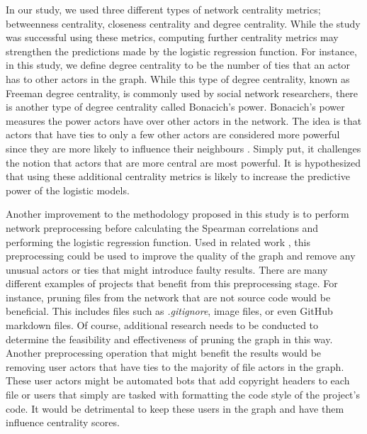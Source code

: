 \documentclass{sig-alternate-05-2015}
\begin{document}
In our study, we used three different types of network centrality metrics; betweenness centrality, closeness centrality and degree centrality. While the study was successful using these metrics, computing further centrality metrics may strengthen the predictions made by the logistic regression function. For instance, in this study, we define degree centrality to be the number of ties that an actor has to other actors in the graph. While this type of degree centrality, known as Freeman degree centrality, is commonly used by social network researchers, there is another type of degree centrality called Bonacich's power. Bonacich's power measures the power actors have over other actors in the network. The idea is that actors that have ties to only a few other actors are considered more powerful since they are more likely to influence their neighbours \cite{hanneman:network_methods}. Simply put, it challenges the notion that actors that are more central are most powerful. It is hypothesized that using these additional centrality metrics is likely to increase the predictive power of the logistic models.

Another improvement to the methodology proposed in this study is to perform network preprocessing before calculating the Spearman correlations and performing the logistic regression function. Used in related work \cite{pingzer:networks}, this preprocessing could be used to improve the quality of the graph and remove any unusual actors or ties that might introduce faulty results. There are many different examples of projects that benefit from this preprocessing stage. For instance, pruning files from the network that are not source code would be beneficial. This includes files such as \textit{.gitignore}, image files, or even GitHub markdown files. Of course, additional research needs to be conducted to determine the feasibility and effectiveness of pruning the graph in this way. Another preprocessing operation that might benefit the results would be removing user actors that have ties to the majority of file actors in the graph. These user actors might be automated bots that add copyright headers to each file or users that simply are tasked with formatting the code style of the project's code. It would be detrimental to keep these users in the graph and have them influence centrality scores.
\end{document}
